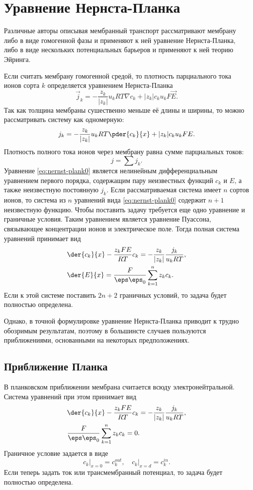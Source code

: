 \documentclass{hedwork}
\begin{document}
\tableofcontents
\section{Уравнение Нернста-Планка}
    Различные авторы описывая мембранный транспорт рассматривают мембрану либо в
    виде гомогенной фазы и применяют к ней уравнение Нернста-Планка, либо в виде
    нескольких потенциальных барьеров и применяют к ней теорию Эйринга.

    Если считать мембрану гомогенной средой, то плотность парциального тока
    ионов сорта \(k\) определяется уравнением Нернста-Планка
    \[
        \vec{j}_k = -\frac{z_k}{|z_k|}u_kRT\nabla c_k + |z_k|c_ku_kF\vec{E}.
    \]
    Так как толщина мембраны сушественно меньше её длины и ширины, то можно
    рассматривать систему как одномерную:
    \begin{equation}
        j_k = -\frac{z_k}{|z_k|}u_kRT\pder{c_k}{x} + |z_k|c_ku_kFE.
        \label{eq:nernst-plank0}
    \end{equation}
    Плотность полного тока ионов через мембрану равна сумме парциальных токов:
    \[
        j = \sum j_k.
    \]
    Уравнение \eqref{eq:nernst-plank0} является нелинейным дифференциальным
    уравнением первого порядка, содержащим пару неизвестных функций \( c_k \) и
    \( E \), а также неизвестную постоянную \( j_k \). Если рассматриваемая
    система имеет \( n \) сортов ионов, то система из \( n \) уравнений вида
    \eqref{eq:nernst-plank0} содержит \( n + 1 \) неизвестную функцию. Чтобы
    поставить задачу требуется еще одно уравнение и граничные условия. Таким
    уравнением является уравнение Пуассона, связывающее концентрации ионов и
    электрическое поле. Тогда полная система уравнений принимает вид
    \begin{align*}
        & \der{c_k}{x} - \frac{z_kFE}{RT}c_k =
            -\frac{z_k}{|z_k|}\frac{j_k}{u_kRT}, \\
        & \der{E}{x} = \frac{F}{\eps\eps_0}\sum_{k=1}^n z_k c_k.
    \end{align*}
    Если к этой системе поставить \( 2n+2 \) граничных условий, то задача будет
    полностью определена.

    Однако, в точной формулировке уравнение Нернста-Планка приводит к трудно
    обозримым результатам, поэтому в большинсте случаев пользуются
    приближениями, основанными на некоторых предположениях.

    \subsection{Приближение Планка}
    В планковском приближении мембрана считается всюду электронейтральной.
    Система уравнений при этом принимает вид
    \begin{align*}
        & \der{c_k}{x} - \frac{z_kFE}{RT}c_k =
            -\frac{z_k}{|z_k|}\frac{j_k}{u_kRT}, \\
        & \frac{F}{\eps\eps_0}\sum_{k=1}^n z_k c_k = 0.
    \end{align*}
    Граничное условие задается в виде
    \[
        \left.c_k\right|_{x=0} = c_k^{out},\quad \left.c_k\right|_{x=d} = c_k^{in}.
    \]
    Если теперь задать ток или трансмембранный потенциал, то задача будет
    полностью определена.
\end{document}
